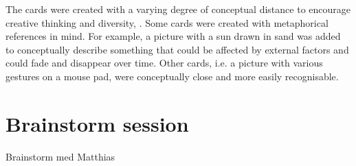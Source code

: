 The cards were created with a varying degree of conceptual distance to encourage creative thinking and diversity, \citep[chap. 10]{benyon2005designing}.
Some cards were created with metaphorical references in mind.
For example, a picture with a sun drawn in sand was added to conceptually describe something that could be affected by external factors and could fade and disappear over time.
Other cards, i.e. a picture with various gestures on a mouse pad, were conceptually close and more easily recognisable.


\section{Brainstorm session}
Brainstorm med Matthias



